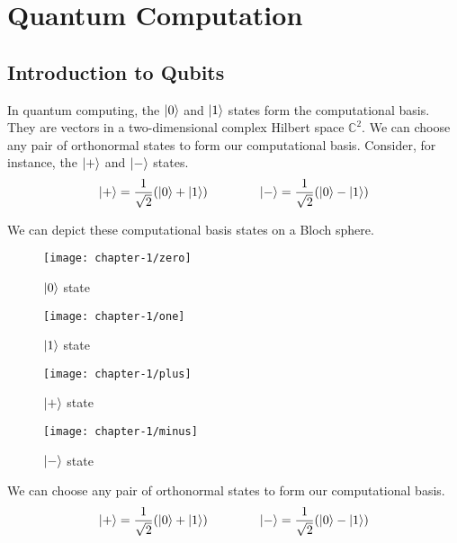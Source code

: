 \section{Quantum Computation}

\begin{comment}
    computational basis states
    bloch spheres
\end{comment}

\subsection{Introduction to Qubits}

In quantum computing, the $\ket 0$ and $\ket 1$ states form the computational basis. They are vectors in a two-dimensional complex Hilbert space $\mathbb{C}^2$. We can choose any pair of orthonormal states to form our computational basis. Consider, for instance, the $\ket +$ and $\ket -$ states.
\begin{equation*}
\begin{gathered}
    \ket + = \frac{1}{\sqrt{2}} (\ket 0 + \ket 1) \qquad\qquad
    \ket - = \frac{1}{\sqrt{2}} (\ket 0 - \ket 1)
\end{gathered}
\end{equation*}

We can depict these computational basis states on a Bloch sphere.
\begin{figure}[H]
\centering
    \begin{minipage}{.4\textwidth}
      \centering
      \texttt{[image: chapter-1/zero]}
      \caption{$\ket 0$ state}
    \end{minipage}%
    \begin{minipage}{.4\textwidth}
      \centering
      \texttt{[image: chapter-1/one]}
      \caption{$\ket 1$ state}
    \end{minipage}
    \begin{minipage}{.4\textwidth}
      \centering
      \texttt{[image: chapter-1/plus]}
      \caption{$\ket +$ state}
    \end{minipage}%
    \begin{minipage}{.4\textwidth}
      \centering
      \texttt{[image: chapter-1/minus]}
      \caption{$\ket -$ state}
    \end{minipage}
\end{figure}

We can choose any pair of orthonormal states to form our computational basis.
\begin{equation*}
\begin{gathered}
    \ket + = \frac{1}{\sqrt{2}} (\ket 0 + \ket 1) \qquad\qquad
    \ket - = \frac{1}{\sqrt{2}} (\ket 0 - \ket 1)
\end{gathered}
\end{equation*}


